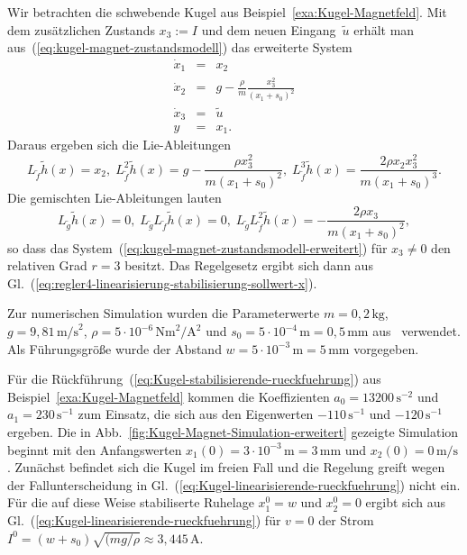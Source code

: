 \begin{example}
\label{exa:Kugel-Magnetfeld-erweitert}Wir betrachten die schwebende
Kugel aus Beispiel~\ref{exa:Kugel-Magnetfeld}. Mit dem zusätzlichen
Zustands $x_{3}:=I$ und dem neuen Eingang~$\tilde{u}$ erhält man
aus~(\ref{eq:kugel-magnet-zustandsmodell}) das erweiterte System
\begin{equation}
\begin{array}{lcl}
\dot{x}_{1} & = & x_{2}\\
\dot{x}_{2} & = & g-\frac{\rho}{m}\frac{x_{3}^{2}}{(x_{1}+s_{0})^{2}}\\
\dot{x}_{3} & = & \tilde{u}\\
y & = & x_{1}.
\end{array}\label{eq:kugel-magnet-zustandsmodell-erweitert}
\end{equation}
Daraus ergeben sich die Lie-Ableitungen
\[
L_{\tilde{f}}\tilde{h}(x)=x_{2},\;L_{\tilde{f}}^{2}\tilde{h}(x)=g-\frac{\rho x_{3}^{2}}{m(x_{1}+s_{0})^{2}},\;L_{\tilde{f}}^{3}\tilde{h}(x)=\frac{2\rho x_{2}x_{3}^{2}}{m(x_{1}+s_{0})^{3}}.
\]
Die gemischten Lie-Ableitungen lauten
\[
L_{\tilde{g}}\tilde{h}(x)=0,\;L_{\tilde{g}}L_{\tilde{f}}\tilde{h}(x)=0,\;L_{\tilde{g}}L_{\tilde{f}}^{2}\tilde{h}(x)=-\frac{2\rho x_{3}}{m(x_{1}+s_{0})^{2}},
\]
so dass das System~(\ref{eq:kugel-magnet-zustandsmodell-erweitert})
für $x_{3}\neq0$ den relativen Grad $r=3$ besitzt. Das Regelgesetz
ergibt sich dann aus Gl.~(\ref{eq:regler4-linearisierung-stabilisierung-sollwert-x}).

Zur numerischen Simulation wurden die Parameterwerte $m=0,2\,\text{kg}$,
$g=9,81\,\text{m/s}^{2}$, $\rho=5\cdot10^{-6}\,\text{Nm}^{2}/\text{A}^{2}$
und $s_{0}=5\cdot10^{-4}\,\text{m}=0,5\,\text{mm}$ aus~\cite{levine1996,von-loewis2002}
verwendet. Als Führungsgröße wurde der Abstand $w=5\cdot10^{-3}\,\text{m}=5\,\text{mm}$
vorgegeben. 

Für die Rückführung~(\ref{eq:Kugel-stabilisierende-rueckfuehrung})
aus Beispiel~\ref{exa:Kugel-Magnetfeld} kommen die Koeffizienten
$a_{0}=13200\,\text{s}^{-2}$ und $a_{1}=230\,\text{s}^{-1}$ zum
Einsatz, die sich aus den Eigenwerten $-110\,\text{s}^{-1}$ und $-120\,\text{s}^{-1}$
ergeben. Die in Abb.~\ref{fig:Kugel-Magnet-Simulation-erweitert}
gezeigte Simulation beginnt mit den Anfangswerten $x_{1}(0)=3\cdot10^{-3}\,\text{m}=3\,\text{mm}$
und $x_{2}(0)=0\,\text{m}/\text{s}$. Zunächst befindet sich die Kugel
im freien Fall und die Regelung greift wegen der Fallunterscheidung
in Gl.~(\ref{eq:Kugel-linearisierende-rueckfuehrung}) nicht ein.
Für die auf diese Weise stabiliserte Ruhelage $x_{1}^{0}=w$ und $x_{2}^{0}=0$
ergibt sich aus Gl.~(\ref{eq:Kugel-linearisierende-rueckfuehrung})
für $v=0$ der Strom $I^{0}=(w+s_{0})\sqrt{(mg/\rho}\approx3,445\,\text{A}$.


\end{example}
